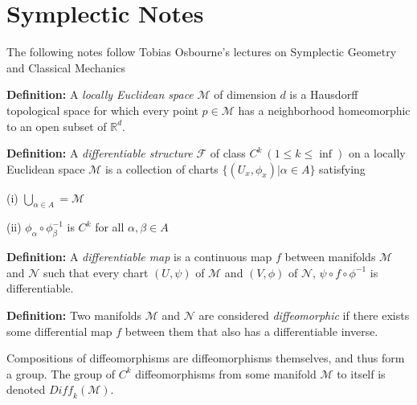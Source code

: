 \documentclass{article}\usepackage[]{graphicx}\usepackage[]{color}
\begin{document}
  \begin{center}


   \end{center}

\pagebreak

\section{Symplectic Notes}

The following notes follow Tobias Osbourne's lectures on Symplectic Geometry and Classical Mechanics %

\textbf{Definition:} A \textit{locally Euclidean space} $\mathcal{M}$ of dimension $d$ is a Hausdorff topological space for which every point $p\in \mathcal{M}$ has a neighborhood homeomorphic to an open subset of $\mathbb{R}^d$.





\textbf{Definition:} A \textit{differentiable structure} $\mathcal{F}$ of class $C^k\ (1\leq k \leq \inf)$ on a locally Euclidean space $\mathcal{M}$ is a collection of charts $\lbrace (U_x , \phi_x)\vert \alpha \in A \rbrace$ satisfying 

(i) $\bigcup_{\alpha \in A}=\mathcal{M}$

(ii) $\phi_{\alpha}\circ\phi_{\beta}^{-1}$ is $C^k$ for all $\alpha ,\beta \in A$




\textbf{Definition:} A \textit{differentiable map} is a continuous map $f$ between manifolds $\mathcal{M}$ and $\mathcal{N}$ such that every chart $(U,\psi )$ of $\mathcal{M}$ and $(V,\phi )$ of $\mathcal{N}$, $\psi\circ f\circ\phi^{-1}$ is differentiable.




\textbf{Definition:} Two manifolds $\mathcal{M}$ and $\mathcal{N}$ are considered \textit{diffeomorphic} if there exists some differential map $f$ between them that also has a differentiable inverse.

Compositions of diffeomorphisms are diffeomorphisms themselves, and thus form a group. The group of $C^k$ diffeomorphisms from some manifold $\mathcal{M}$ to itself is denoted $\mathit{Diff_k}(\mathcal{M})$.
\end{document}
